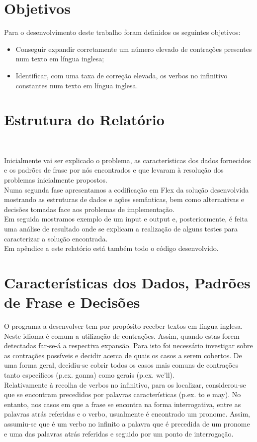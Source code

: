 \documentclass{report}
\begin{document}
\section*{Objetivos}
Para o desenvolvimento deste trabalho foram definidos os seguintes objetivos:
\\
\begin{itemize}
\item Conseguir expandir corretamente um número elevado de contrações presentes num texto em língua inglesa;
\item Identificar, com uma taxa de correção elevada, os verbos no infinitivo constantes num texto em língua inglesa.
\end{itemize}
\newpage
\section*{Estrutura do Relatório} \

Inicialmente vai ser explicado o problema, as características dos dados fornecidos e os padrões de frase por nós encontrados e que levaram à resolução dos problemas inicialmente propostos.\\
Numa segunda fase apresentamos a codificação em Flex da solução desenvolvida mostrando as estruturas de dados e ações semânticas, bem como alternativas e decisões tomadas face aos problemas de implementação.\\
Em seguida mostramos exemplo de um input e output e, posteriormente, é feita uma análise de resultado onde se explicam a realização de alguns testes para caracterizar a solução encontrada.\\
Em apêndice a este relatório está também todo o código desenvolvido.

\section*{Características dos Dados, Padr\~oes de Frase e Decisões}

O programa a desenvolver tem por propósito receber textos em língua inglesa. Neste idioma é comum a utilização de contrações. Assim, quando estas forem detectadas far-se-á a respectiva expansão. Para isto foi necessário investigar sobre as contrações possíveis e decidir acerca de quais os casos a serem cobertos. De uma forma geral, decidiu-se cobrir todos os casos mais comuns de contrações tanto específicos (p.ex. gonna) como gerais (p.ex. we’ll).\\
Relativamente à recolha de verbos no infinitivo, para os localizar, considerou-se que se encontram precedidos por palavras características (p.ex. to e may). No entanto, nos casos em que a frase se encontra na forma interrogativa, entre as palavras atrás referidas e o verbo, usualmente é encontrado um pronome. Assim, assumiu-se que é um verbo no infinito a palavra que é precedida de um pronome e uma das palavras atrás referidas e seguido por um ponto de interrogação.
\end{document}
